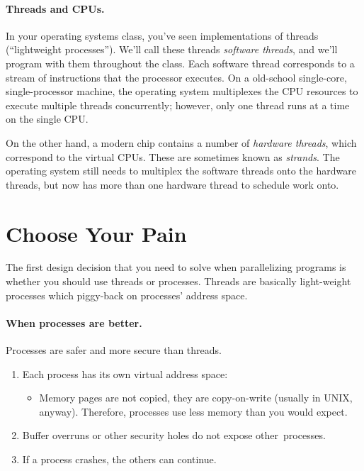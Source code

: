 \documentclass[a4paper]{report}
\begin{document}
\paragraph{Threads and CPUs.} In your operating systems class,
you've seen implementations of threads (``lightweight processes'').
We'll call these threads \emph{software threads}, and we'll program
with them throughout the class. Each software thread corresponds to a
stream of instructions that the processor executes. On a old-school
single-core, single-processor machine, the operating system
multiplexes the CPU resources to execute multiple threads
concurrently; however, only one thread runs at a time on the single
CPU.

On the other hand, a modern chip contains a number of \emph{hardware
threads}, which correspond to the virtual CPUs. These are sometimes
known as \emph{strands}. The operating system still needs to 
multiplex the software threads onto the hardware threads, but now has
more than one hardware thread to schedule work onto.





\section*{Choose Your Pain}
The first design decision that you need to solve when parallelizing programs
is whether you should use threads or processes. Threads are basically light-weight processes which piggy-back on
          processes' address space.

\paragraph{When processes are better.} Processes are safer and more secure than threads.

  \begin{enumerate}
    \item Each process has its own virtual address space:
      \begin{itemize}
        \item Memory pages are not copied, they are copy-on-write (usually in UNIX, anyway). Therefore, processes use less memory than you would expect.
      \end{itemize}
    \item Buffer overruns or other security holes do not expose other~processes.
    \item If a process crashes, the others can continue.
  \end{enumerate}
\end{document}
